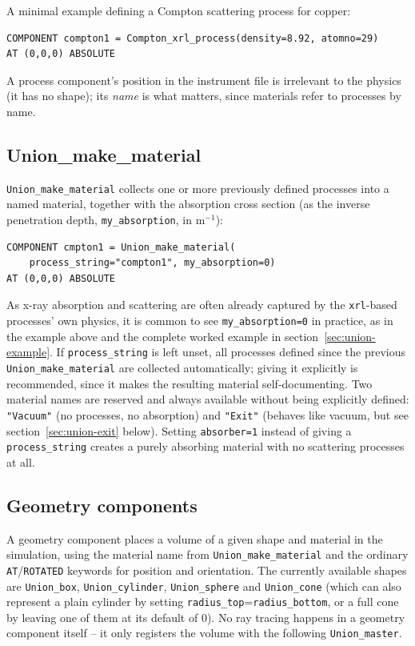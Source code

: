 A minimal example defining a Compton scattering process for copper:
\begin{lstlisting}
COMPONENT compton1 = Compton_xrl_process(density=8.92, atomno=29)
AT (0,0,0) ABSOLUTE
\end{lstlisting}
A process component's position in the instrument file is irrelevant to the
physics (it has no shape); its \emph{name} is what matters, since
materials refer to processes by name.

\subsection{Union\_make\_material}
\label{sec:union-materials}

\texttt{Union\_make\_material} collects one or more previously defined
processes into a named material, together with the absorption cross
section (as the inverse penetration depth, \texttt{my\_absorption}, in
m$^{-1}$):
\begin{lstlisting}
COMPONENT cmpton1 = Union_make_material(
    process_string="compton1", my_absorption=0)
AT (0,0,0) ABSOLUTE
\end{lstlisting}
As x-ray absorption and scattering are often already captured by the
\texttt{xrl}-based processes' own physics, it is common to see
\texttt{my\_absorption=0} in practice, as in the example above and the
complete worked example in section~\ref{sec:union-example}. If
\texttt{process\_string} is left unset, all processes defined since the
previous \texttt{Union\_make\_material} are collected automatically; giving
it explicitly is recommended, since it makes the resulting material
self-documenting. Two material names are reserved and always available
without being explicitly defined: \texttt{"Vacuum"} (no processes, no
absorption) and \texttt{"Exit"} (behaves like vacuum, but see
section~\ref{sec:union-exit} below). Setting \texttt{absorber=1} instead
of giving a \texttt{process\_string} creates a purely absorbing material
with no scattering processes at all.

\subsection{Geometry components}
\label{sec:union-geometry}

A geometry component places a volume of a given shape and material in the
simulation, using the material name from \texttt{Union\_make\_material}
and the ordinary \texttt{AT}/\texttt{ROTATED} keywords for position and
orientation. The currently available shapes are \texttt{Union\_box},
\texttt{Union\_cylinder}, \texttt{Union\_sphere} and \texttt{Union\_cone}
(which can also represent a plain cylinder by setting
\texttt{radius\_top}=\texttt{radius\_bottom}, or a full cone by leaving one
of them at its default of 0). No ray tracing happens in a geometry
component itself -- it only registers the volume with the following
\texttt{Union\_master}.

